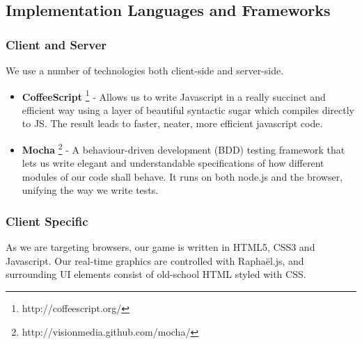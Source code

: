 \documentclass[a4wide, 11pt]{article}
\begin{document}
\subsection{Implementation Languages and Frameworks}
\subsubsection{Client and Server}
We use a number of technologies both client-side and server-side.

\begin{itemize}
  \item
    {\bf CoffeeScript}
    \footnote{http://coffeescript.org/}
    - Allows us to write Javascript in a really succinct and efficient way using a layer of beautiful syntactic sugar which compiles directly to JS. The result leads to faster, neater, more efficient javascript code.
  
  \item
    {\bf Mocha}
    \footnote{http://visionmedia.github.com/mocha/}
    - A behaviour-driven development (BDD) testing framework that lets us write elegant and understandable specifications of how different modules of our code shall behave. It runs on both node.js and the browser, unifying the way we write tests.
\end{itemize}


\subsubsection{Client Specific}
As we are targeting browsers, our game is written in HTML5, CSS3 and Javascript. Our real-time graphics are controlled with Rapha\"{e}l.js, and surrounding UI elements consist of old-school HTML styled with CSS.
\end{document}
